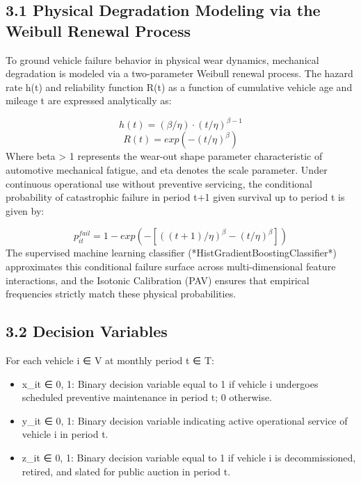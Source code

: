 \documentclass[10pt,a4paper,journal]{article}
\begin{document}
\subsection{3.1 Physical Degradation Modeling via the Weibull Renewal Process}
To ground vehicle failure behavior in physical wear dynamics, mechanical degradation is modeled via a two-parameter Weibull renewal process. The hazard rate h(t) and reliability function R(t) as a function of cumulative vehicle age and mileage t are expressed analytically as:

\begin{equation}
h(t) = (\beta / \eta) \cdot (t / \eta)^{\beta - 1} \label{eq:1}
\end{equation}
\begin{equation}
R(t) = exp( - (t / \eta)^{\beta} ) \label{eq:2}
\end{equation}
Where beta > 1 represents the wear-out shape parameter characteristic of automotive mechanical fatigue, and eta denotes the scale parameter. Under continuous operational use without preventive servicing, the conditional probability of catastrophic failure in period t+1 given survival up to period t is given by:

\begin{equation}
p_{it}^{fail} = 1 - exp( - [ ((t + 1) / \eta)^{\beta} - (t / \eta)^{\beta} ] ) \label{eq:3}
\end{equation}
The supervised machine learning classifier (*HistGradientBoostingClassifier*) approximates this conditional failure surface across multi-dimensional feature interactions, and the Isotonic Calibration (PAV) ensures that empirical frequencies strictly match these physical probabilities.

\subsection{3.2 Decision Variables}
For each vehicle i ∈ V at monthly period t ∈ T:

\begin{itemize}
\item x\_it ∈ {0, 1}: Binary decision variable equal to 1 if vehicle i undergoes scheduled preventive maintenance in period t; 0 otherwise.
\end{itemize}
\begin{itemize}
\item y\_it ∈ {0, 1}: Binary decision variable indicating active operational service of vehicle i in period t.
\end{itemize}
\begin{itemize}
\item z\_it ∈ {0, 1}: Binary decision variable equal to 1 if vehicle i is decommissioned, retired, and slated for public auction in period t.
\end{itemize}
\end{document}
